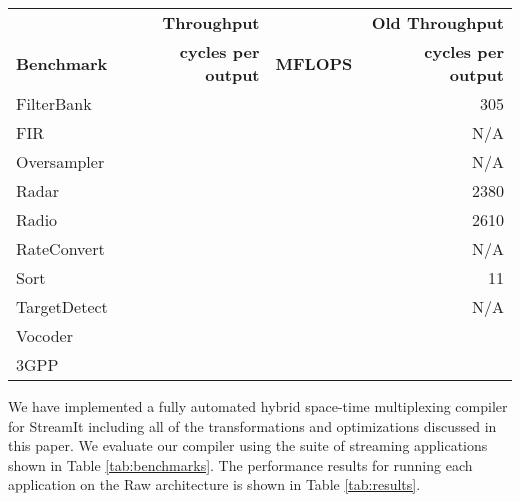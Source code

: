 \begin{table*}[t]
\begin{center}
\scriptsize
\begin{tabular}{|l||r|r||r||}\hline
& {\bf Throughput} &  & {\bf Old Throughput}\\
{\bf Benchmark} &  {\bf cycles per output} & {\bf MFLOPS} &  {\bf cycles per output}\\ 
\hline \hline
FilterBank & & & 305 \\ \hline
FIR & & & N/A\\ \hline
Oversampler & & & N/A \\ \hline
Radar & & & 2380 \\ \hline
Radio & & & 2610 \\ \hline
RateConvert & & & N/A\\ \hline
Sort & & & 11 \\ \hline
TargetDetect & & & N/A\\ \hline
Vocoder & & & \\ \hline
3GPP& & & \\ \hline
\hline
\end{tabular}
\caption{\protect\small Performance Results.}
\label{tab:results}
\end{center}
\end{table*}

We have implemented a fully automated hybrid space-time multiplexing
compiler for StreamIt including all of the transformations and
optimizations discussed in this paper.  We evaluate our compiler using
the suite of streaming applications shown in Table
\ref{tab:benchmarks}.  The performance results for running each
application on the Raw architecture is shown in Table
\ref{tab:results}.
